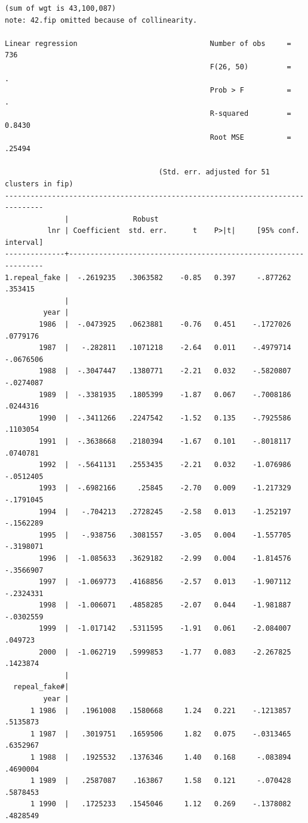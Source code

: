 \documentclass[
]{book}
\begin{document}
\begin{verbatim}
(sum of wgt is 43,100,087)
note: 42.fip omitted because of collinearity.

Linear regression                               Number of obs     =        736
                                                F(26, 50)         =          .
                                                Prob > F          =          .
                                                R-squared         =     0.8430
                                                Root MSE          =     .25494

                                    (Std. err. adjusted for 51 clusters in fip)
-------------------------------------------------------------------------------
              |               Robust
          lnr | Coefficient  std. err.      t    P>|t|     [95% conf. interval]
--------------+----------------------------------------------------------------
1.repeal_fake |  -.2619235   .3063582    -0.85   0.397     -.877262     .353415
              |
         year |
        1986  |  -.0473925   .0623881    -0.76   0.451    -.1727026    .0779176
        1987  |   -.282811   .1071218    -2.64   0.011    -.4979714   -.0676506
        1988  |  -.3047447   .1380771    -2.21   0.032    -.5820807   -.0274087
        1989  |  -.3381935   .1805399    -1.87   0.067    -.7008186    .0244316
        1990  |  -.3411266   .2247542    -1.52   0.135    -.7925586    .1103054
        1991  |  -.3638668   .2180394    -1.67   0.101    -.8018117    .0740781
        1992  |  -.5641131   .2553435    -2.21   0.032    -1.076986   -.0512405
        1993  |  -.6982166     .25845    -2.70   0.009    -1.217329   -.1791045
        1994  |   -.704213   .2728245    -2.58   0.013    -1.252197   -.1562289
        1995  |   -.938756   .3081557    -3.05   0.004    -1.557705   -.3198071
        1996  |  -1.085633   .3629182    -2.99   0.004    -1.814576   -.3566907
        1997  |  -1.069773   .4168856    -2.57   0.013    -1.907112   -.2324331
        1998  |  -1.006071   .4858285    -2.07   0.044    -1.981887   -.0302559
        1999  |  -1.017142   .5311595    -1.91   0.061    -2.084007     .049723
        2000  |  -1.062719   .5999853    -1.77   0.083    -2.267825    .1423874
              |
  repeal_fake#|
         year |
      1 1986  |   .1961008   .1580668     1.24   0.221    -.1213857    .5135873
      1 1987  |   .3019751   .1659506     1.82   0.075    -.0313465    .6352967
      1 1988  |   .1925532   .1376346     1.40   0.168     -.083894    .4690004
      1 1989  |   .2587087    .163867     1.58   0.121     -.070428    .5878453
      1 1990  |   .1725233   .1545046     1.12   0.269    -.1378082    .4828549

\end{verbatim}
\end{document}
